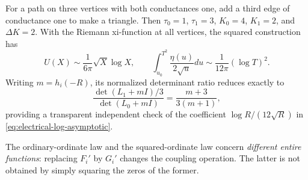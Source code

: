 For a path on three vertices with both conductances one, add a third
edge of conductance one to make a triangle.  Then
$\tau_0=1$, $\tau_1=3$, $K_0=4$, $K_1=2$, and $\Delta K=2$.
With the Riemann xi-function at all vertices, the squared construction
has
\[
 U(X)\sim\frac{1}{6\pi}\sqrt X\log X,
 \qquad
 \int_{u_0}^{T^2}\frac{\eta(u)}{2\sqrt u}du
      \sim\frac{1}{12\pi}(\log T)^2.
\]
Writing $m=h_i(-R)$, its normalized determinant ratio reduces exactly to
\[
 \frac{\det(L_1+mI)/3}{\det(L_0+mI)}
    =\frac{m+3}{3(m+1)},
\]
providing a transparent independent check of the coefficient
$\log R/(12\sqrt R)$ in \eqref{eq:electrical-log-asymptotic}.

The ordinary-ordinate law and the squared-ordinate law concern
\emph{different entire functions}: replacing $F_i'$ by $G_i'$ changes
the coupling operation.  The latter is not obtained by simply squaring
the zeros of the former.
